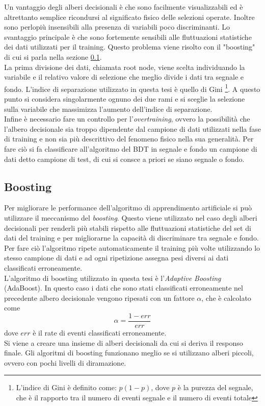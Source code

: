     Un vantaggio degli alberi decisionali è che sono facilmente visualizzabili ed è altrettanto semplice ricondursi al significato fisico delle selezioni operate. Inoltre sono perlopiù insensibili alla presenza di variabili poco discriminanti. Lo svantaggio principale è che sono fortemente sensibili alle fluttuazioni statistiche dei dati utilizzati per il training. Questo problema viene risolto con il "boosting" di cui si parla nella sezione  \ref{Boosting}.
    \\La prima divisione dei dati, chiamata root node, viene scelta individuando la variabile e il relativo valore di selezione che meglio divide i dati tra segnale e fondo. L'indice di separazione utilizzato in questa tesi è quello di Gini \footnote{L'indice di Gini è definito come: $p (1-p)$, dove $p$ è la purezza del segnale, che è il rapporto tra il numero di eventi segnale e il numero di eventi totale}. A questo punto si considera singolarmente ognuno dei due rami e si sceglie la selezione sulla variabile che massimizza l'aumento dell'indice di separazione.
    \\Infine è necessario fare un controllo per l'\textit{overtraining}, ovvero la possibilità che l'albero decisionale sia troppo dipendente dal campione di dati utilizzati nella fase di training e non sia più descrittivo del fenomeno fisico nella sua generalità. Per fare ciò si fa classificare all'algoritmo del BDT in segnale e fondo un campione di dati detto campione di test, di cui si consce a priori se siano segnale o fondo.
 
    \subsection{Boosting} \label{Boosting}
    Per migliorare le performance dell'algoritmo di apprendimento artificiale si pu\`o utilizzare il meccanismo del \textit{boosting}. Questo viene utilizzato nel caso degli alberi decisionali per renderli più stabili rispetto alle fluttuazioni statistiche del set di dati del training e per migliorarne la capacit\`a di discriminare tra segnale e fondo. Per fare ciò l'algoritmo ripete automaticamente il training pi\`u volte utilizzando lo stesso campione di dati e ad ogni ripetizione assegna pesi diversi ai dati classificati erroneamente.
    \\L'algoritmo di boosting utilizzato in questa tesi è l'\textit{Adaptive Boosting} (AdaBoost). In questo caso i dati che sono stati classificati erroneamente nel precedente albero decisionale vengono ripesati con un fattore $\alpha$, che è calcolato come 
        \begin{equation}
            \alpha = \frac{1 - err}{err}
        \end{equation}
    dove $err$ è il rate di eventi classificati erroneamente. 
    \\Si viene a creare una insieme di alberi decisionali da cui si deriva il responso finale. Gli algoritmi di boosting funzionano meglio se si utilizzano alberi piccoli, ovvero con pochi livelli di diramazione.
    
